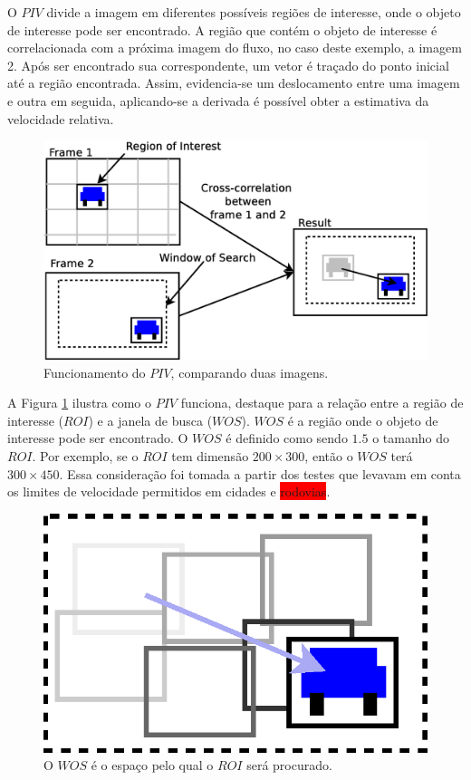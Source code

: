 O $PIV$ divide a imagem em diferentes possíveis regiões de interesse, onde o objeto de interesse pode ser encontrado. 
A região que contém o objeto de 
interesse é correlacionada com a próxima imagem do fluxo, no caso deste exemplo, a imagem 2. 
Após ser encontrado sua correspondente, um vetor é traçado do ponto inicial
até a região encontrada. Assim, evidencia-se um deslocamento entre uma imagem e outra em seguida, aplicando-se  a derivada 
é possível obter a  estimativa da velocidade relativa.

\begin{figure}[H]
\includegraphics[width=\columnwidth]{images/explanationPIV.eps}
\caption{Funcionamento do $PIV$, comparando duas imagens.}
\label{fig:twoframes}
\end{figure}

A Figura \ref{fig:twoframes} ilustra como o $PIV$ funciona, destaque para a relação entre a região de interesse ($ROI$) e 
a janela de busca ($WOS$). $WOS$ é a região onde o objeto de interesse pode ser encontrado.
O $WOS$ é definido como sendo $1.5$ o tamanho do $ROI$. Por exemplo, se o $ROI$ tem dimensão $200\times300$, então o $WOS$ terá $300\times450$.
Essa consideração foi tomada a partir dos testes que levavam em conta os limites de velocidade permitidos em 
cidades e \colorbox{red}{rodovias}.


\begin{figure}[H]
\includegraphics[width=\columnwidth]{images/WOSdivided.eps}
\caption{O $WOS$ é o espaço pelo qual o $ROI$ será procurado.}
\label{fig:WOSdivided}
\end{figure}

